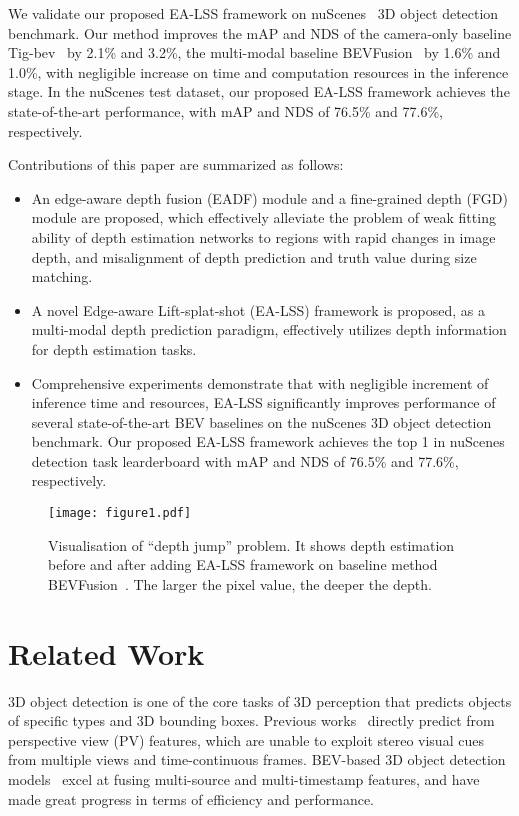\documentclass[letterpaper]{article} \usepackage[submission]{aaai24}  \usepackage{times}  \usepackage{helvet}  \usepackage{courier}  \usepackage[hyphens]{url}  \usepackage{graphicx} \urlstyle{rm} \def\UrlFont{\rm}  \usepackage{natbib}  \usepackage{caption} \frenchspacing  \setlength{\pdfpagewidth}{8.5in} \setlength{\pdfpageheight}{11in} \usepackage{algorithm}
\begin{document}
We validate our proposed EA-LSS framework on nuScenes~\cite{caesar2020nuScenes} 3D object detection benchmark. Our method improves the mAP and NDS of the camera-only baseline Tig-bev~\cite{huang2022tigbev} by 2.1\% and 3.2\%, the multi-modal baseline BEVFusion~\cite{liu2022bevfusion} by 1.6\% and 1.0\%, with negligible increase on time and computation resources in the inference stage.  In the nuScenes test dataset, our proposed EA-LSS framework achieves the state-of-the-art performance, with mAP and NDS of 76.5\% and 77.6\%, respectively.

Contributions of this paper are summarized as follows:
\begin{itemize}
    \item An edge-aware depth fusion (EADF) module and a fine-grained depth (FGD) module are proposed, which effectively alleviate the problem of weak fitting ability of depth estimation networks to regions with rapid changes in image depth, and misalignment of depth prediction and truth value during size matching.
    \item A novel Edge-aware Lift-splat-shot (EA-LSS) framework is proposed, as a multi-modal depth prediction paradigm, effectively utilizes depth information for depth estimation tasks.
    \item Comprehensive experiments demonstrate that with negligible increment of inference time and resources, EA-LSS significantly improves performance of several state-of-the-art BEV baselines on the nuScenes 3D object detection benchmark. Our proposed EA-LSS framework achieves the top 1 in nuScenes detection task learderboard with mAP and NDS of 76.5\% and 77.6\%, respectively.
\end{itemize}


\begin{figure}[t]
\begin{center}
\texttt{[image: figure1.pdf]}
\end{center}
   \caption{Visualisation of ``depth jump'' problem. It shows depth estimation before and after adding EA-LSS framework on baseline method BEVFusion~\cite{liu2022bevfusion}. The larger the pixel value, the deeper the depth. }
   \label{fig:motivation}
\end{figure}





\section{Related Work}
3D object detection is one of the core tasks of 3D perception that predicts objects of specific types and 3D bounding boxes. Previous works~\cite{zhou2019centernet, wang2021fcos3d,lang2019pointpillars,shi2019pointrcnn,yan2018second,chen2022futr3d,vora2020pointpainting} directly predict from perspective view (PV) features, which are unable to exploit stereo visual cues from multiple views and time-continuous frames. BEV-based 3D object detection models~\cite{liu2022bevfusion, liang2022bevfusion, reading2021categorical, huang2021bevdet,huang2022bevdet4d,yin2021Multimodal} excel at fusing multi-source and multi-timestamp features, and have made great progress in terms of efficiency and performance.
\end{document}

